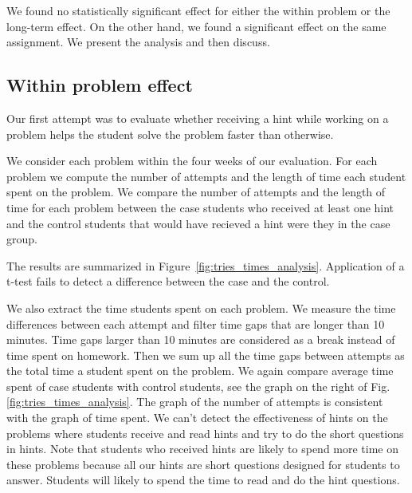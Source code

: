 \documentclass{llncs2e/llncs}
\begin{document}
We found no statistically significant effect for either the within problem or
the long-term effect. On the other hand, we found a significant effect
on the same assignment. We present the analysis and then discuss.

\subsection{Within problem effect}

Our first attempt was to evaluate whether receiving a hint while
working on a problem helps the student solve the problem faster than
otherwise.

We consider each problem within the four weeks of our evaluation. For
each problem we compute the number of attempts and the length of time
each student spent on the problem. We compare the number of attempts
and the length of time for each problem between the case students who
received at least one hint and the control students
that would have recieved a hint were they in the case group.

The results are summarized in
Figure~\ref{fig:tries_times_analysis}. Application of a t-test fails
to detect a difference between the case and the control.

\iffalse
We also extract the time students spent on each problem. We measure the time differences between each attempt and filter time gaps that are longer than 10 minutes. Time gaps larger than 10 minutes are considered as a break instead of time spent on homework. Then we sum up all the time gaps between attempts as the total time a student spent on the problem. We again compare average time spent of case students with control students, see the graph on the right of Fig. \ref{fig:tries_times_analysis}. The graph of the number of attempts is consistent with the graph of time spent. We can't detect the effectiveness of hints on the problems where students receive and read hints and try to do the short questions in hints. Note that students who received hints are likely to spend more time on these problems because all our hints are short questions designed for students to answer. Students will likely to spend the time to read and do the hint questions.
\end{document}
